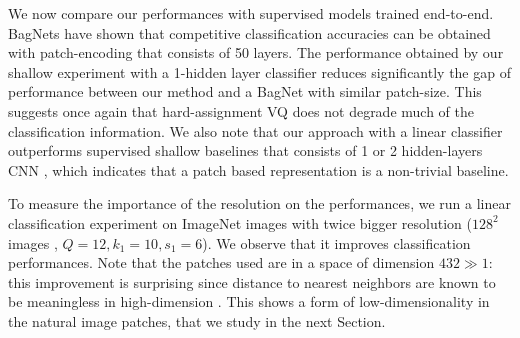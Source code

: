 \documentclass{article} %
\begin{document}

We now compare our performances with supervised models trained end-to-end.
BagNets \citep{brendel2019approximating} have shown that  competitive classification accuracies can be obtained with patch-encoding that consists of 50 layers.
The performance obtained by our shallow experiment with a 1-hidden layer classifier reduces significantly the gap of performance between our method and a BagNet with similar patch-size.
This suggests once again that hard-assignment VQ does not degrade much of the classification information.
We also note that our approach with a linear classifier outperforms supervised shallow baselines that consists of 1 or 2 hidden-layers CNN \citep{belilovsky2018greedy}, which indicates that a patch based representation is a non-trivial baseline.

To measure the importance of the resolution on the performances, we run a linear classification experiment on ImageNet images with twice bigger resolution ($128^2$ images , $Q=12, k_1=10,s_1=6$).
We observe that it improves classification performances.
Note that the patches used are in a space of dimension $432 \gg 1$: this improvement is surprising since distance to nearest neighbors are known to be meaningless in high-dimension \citep{beyer1999nearest}.
This shows a form of low-dimensionality in the natural image patches, that we study in the next Section.
\end{document}
